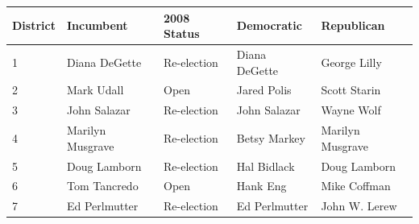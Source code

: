 \documentclass{article}
\begin{document}
\begin{tabular}{lllll}
\toprule
District & Incumbent & 2008 Status & Democratic & Republican \\
\midrule
1 & Diana DeGette & Re-election & Diana DeGette & George Lilly \\
2 & Mark Udall & Open & Jared Polis & Scott Starin \\
3 & John Salazar & Re-election & John Salazar & Wayne Wolf \\
4 & Marilyn Musgrave & Re-election & Betsy Markey & Marilyn Musgrave \\
5 & Doug Lamborn & Re-election & Hal Bidlack & Doug Lamborn \\
6 & Tom Tancredo & Open & Hank Eng & Mike Coffman \\
7 & Ed Perlmutter & Re-election & Ed Perlmutter & John W. Lerew \\
\bottomrule
\end{tabular}
\end{document}
